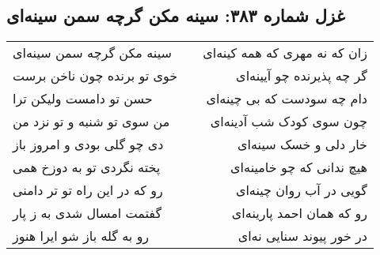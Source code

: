 \begin{center}
\section*{غزل شماره ۳۸۳: سینه مکن گرچه سمن سینه‌ای}
\label{sec:383}
\begin{longtable}{l p{0.5cm} r}
سینه مکن گرچه سمن سینه‌ای
&&
زان که نه مهری که همه کینه‌ای
\\
خوی تو برنده چون ناخن برست
&&
گر چه پذیرنده چو آیینه‌ای
\\
حسن تو دامست ولیکن ترا
&&
دام چه سودست که بی چینه‌ای
\\
من سوی تو شنبه و تو نزد من
&&
چون سوی کودک شب آدینه‌ای
\\
دی چو گلی بودی و امروز باز
&&
خار دلی و خسک سینه‌ای
\\
پخته نگردی تو به دوزخ همی
&&
هیچ ندانی که چو خامینه‌ای
\\
رو که در این راه تو تر دامنی
&&
گویی در آب روان چینه‌ای
\\
گفتمت امسال شدی به ز پار
&&
رو که همان احمد پارینه‌ای
\\
رو به گله باز شو ایرا هنوز
&&
در خور پیوند سنایی نه‌ای
\\
\end{longtable}
\end{center}
